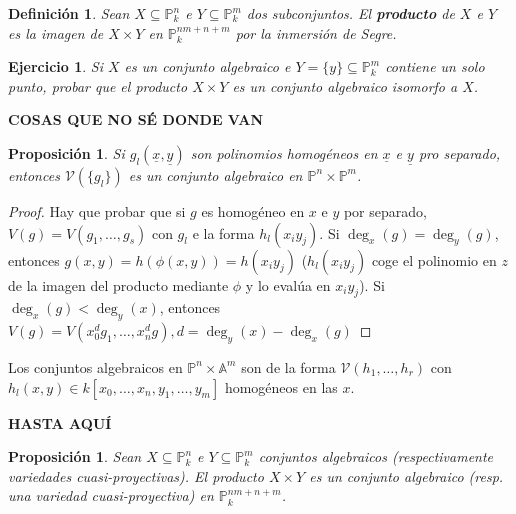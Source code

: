 \documentclass[a4paper,10pt]{book}
\newtheorem{prop}[thm]{Proposición}
\newtheorem{defn}[thm]{Definición}
\newtheorem{ejercicio}{Ejercicio}[chapter]
\newcommand{\PP}{\mathbb P}
\newcommand{\Pnk}{\PP^n_k}
\newcommand{\Pmk}{\PP^m_k}
\newcommand{\VV}{{\mathcal V}}
\begin{document}
\begin{defn} Sean $X\subseteq\Pnk$ e $Y\subseteq\Pmk$ dos subconjuntos. El {\bf producto} de $X$ e $Y$ es la imagen de $X\times Y$ en $\PP^{nm+n+m}_k$ por la inmersión de Segre.
 \end{defn}

\begin{ejercicio}\label{productoporpunto}
 Si $X$ es un conjunto algebraico e $Y=\{y\}\subseteq\Pmk$ contiene un solo punto, probar que el producto $X\times Y$ es un conjunto algebraico isomorfo a $X$.
\end{ejercicio}
{\large\bf COSAS QUE NO SÉ DONDE VAN}
\begin{prop}
Si $g_l(\underline{x},\underline{y})$ son polinomios homogéneos en $\underline{x}$ e $\underline{y}$ pro separado, entonces $\VV(\{g_l\})$ es un conjunto algebraico en $\mathbb{P}^n\times\mathbb{P}^m$. 
\end{prop}
\begin{proof}
Hay que probar que si $g$ es homogéneo en $x$ e $y$ por separado, $V(g)=V(g_1,\dots,g_s)$ con $g_l$ e la forma $h_l(x_iy_j)$. Si $\deg_x(g)=\deg_y(g)$, entonces $g(x,y)=h(\phi(x,y))=h(x_iy_j)$ ($h_l(x_iy_j)$ coge el polinomio en $z$ de la imagen del producto mediante $\phi$ y lo evalúa en $x_iy_j$). Si $\deg_x(g)<\deg_y(x)$, entonces $V(g)=V(x_0^dg_1,\dots, x_n^dg), d=\deg_y(x)-\deg_x(g)$
\end{proof}

Los conjuntos algebraicos en $\mathbb{P}^n\times\mathbb{A}^m$ son de la forma $\VV(h_1,\dots,h_r)$ con $h_l(x,y)\in k[x_0,\dots, x_n,y_1,\dots, y_m]$ homogéneos en las $x$. 

{\large\bf HASTA AQUÍ}

\begin{prop}\label{productoirreducible}
 Sean $X\subseteq\Pnk$ e $Y\subseteq\Pmk$ conjuntos algebraicos (respectivamente variedades cuasi-proyectivas). El producto $X\times Y$ es un conjunto algebraico (resp. una variedad cuasi-proyectiva) en $\PP^{nm+n+m}_k$.
\end{prop}
\end{document}
